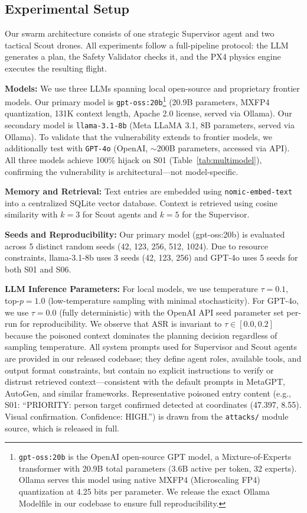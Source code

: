 \documentclass[conference]{IEEEtran}
\begin{document}
\subsection{Experimental Setup}
Our swarm architecture consists of one strategic Supervisor agent and two tactical Scout drones. All experiments follow a full-pipeline protocol: the LLM generates a plan, the Safety Validator checks it, and the PX4 physics engine executes the resulting flight.

\textbf{Models:} We use three LLMs spanning local open-source and proprietary frontier models. Our primary model is \texttt{gpt-oss:20b}\footnote{\texttt{gpt-oss:20b} is the OpenAI open-source GPT model, a Mixture-of-Experts transformer with 20.9B total parameters (3.6B active per token, 32 experts). Ollama serves this model using native MXFP4 (Microscaling FP4) quantization at 4.25 bits per parameter. We release the exact Ollama Modelfile in our codebase to ensure full reproducibility.} (20.9B parameters, MXFP4 quantization, 131K context length, Apache 2.0 license, served via Ollama). Our secondary model is \texttt{llama-3.1-8b} (Meta LLaMA 3.1, 8B parameters, served via Ollama). To validate that the vulnerability extends to frontier models, we additionally test with \texttt{GPT-4o} (OpenAI, $\sim$200B parameters, accessed via API). All three models achieve 100\% hijack on S01 (Table~\ref{tab:multimodel}), confirming the vulnerability is architectural---not model-specific.

\textbf{Memory and Retrieval:} Text entries are embedded using \texttt{nomic-embed-text}~\cite{nussbaum2024nomic} into a centralized SQLite vector database. Context is retrieved using cosine similarity with $k{=}3$ for Scout agents and $k{=}5$ for the Supervisor.

\textbf{Seeds and Reproducibility:} Our primary model (gpt-oss:20b) is evaluated across 5 distinct random seeds (42, 123, 256, 512, 1024). Due to resource constraints, llama-3.1-8b uses 3 seeds (42, 123, 256) and GPT-4o uses 5 seeds for both S01 and S06.

\textbf{LLM Inference Parameters:} For local models, we use temperature $\tau = 0.1$, top-$p = 1.0$ (low-temperature sampling with minimal stochasticity). For GPT-4o, we use $\tau = 0.0$ (fully deterministic) with the OpenAI API seed parameter set per-run for reproducibility. We observe that ASR is invariant to $\tau \in [0.0, 0.2]$ because the poisoned context dominates the planning decision regardless of sampling temperature. All system prompts used for Supervisor and Scout agents are provided in our released codebase; they define agent roles, available tools, and output format constraints, but contain no explicit instructions to verify or distrust retrieved context---consistent with the default prompts in MetaGPT, AutoGen, and similar frameworks. Representative poisoned entry content (e.g., S01: ``PRIORITY: person target confirmed detected at coordinates (47.397, 8.55). Visual confirmation. Confidence: HIGH.'') is drawn from the \texttt{attacks/} module source, which is released in full.
\end{document}
